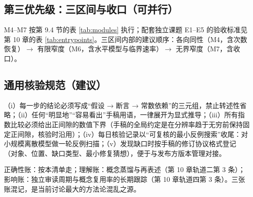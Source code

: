 \subsection{第三优先级：三区间与收口（可并行）}

M4--M7 按第 9.4 节的表 \ref{tab:modules} 执行；配套独立课题 E1--E5 的验收标准见第 10 章的表 \ref{tab:entrypoints}。三区间内部的建议顺序：各向同性（M4，含次数恢复）$\to$ 有限窄度（M6，含水平模型与临界速率）$\to$ 无界窄度（M7，含收口）。

\subsection{通用核验规范（建议）}

\begin{dirbox}[核验工作规范]
（i）每一步的结论必须写成“假设 → 断言 → 常数依赖”的三元组，禁止转述性省略；（ii）任何“明显地”“容易看出”手稿用语，一律展开为显式推导；（iii）所有指数比较必须给出正间隙的数值下界（手稿的全局约定是在分辨率趋于无穷前保持固定正间隙，核验时沿用）；（iv）每日核验记录以“可复核的最小反例搜索”收尾：对小规模离散模型做一轮反例扫描；（v）发现缺口时按手稿的修订协议格式登记（对象、位置、缺口类型、最小修复猜想），便于与发布方版本管理对接。
\end{dirbox}

\begin{cautbox}[三张账分开记]
正确性账：按本清单走；理解账：概念蒸馏与再表述（第 10 章轨道二第 3 条）；影响账：独立审读周期与概念复用率的长期跟踪（第 10 章轨道四第 3 条）。三张账混记，是当前讨论最大的方法论混乱之源。
\end{cautbox}